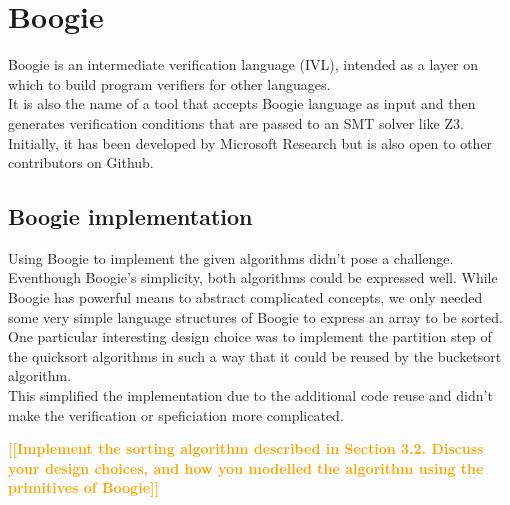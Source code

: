 \documentclass{report}
\newcommand{\todo}[1]{\textsf{\textbf{\textcolor{orange}{[[#1]]}}}}
\begin{document}
\section{Boogie}
\label{s:boogie}
Boogie is an intermediate verification language (IVL), intended as a layer on which to build program verifiers for other languages\cite{boogiegithub}.\\
It is also the name of a tool that accepts Boogie language as input and then generates verification conditions that are passed to an SMT solver like Z3\cite{z3}.\\
Initially, it has been developed by Microsoft Research but is also open to other contributors on Github.

\subsection{Boogie implementation}

Using Boogie to implement the given algorithms didn't pose a challenge.
Eventhough Boogie's simplicity, both algorithms could be expressed well.
While Boogie has powerful means to abstract complicated concepts, we only
needed some very simple language structures of Boogie to express an array to be
sorted.\\
One particular interesting design choice was to implement the partition step
of the quicksort algorithms in such a way that it could be reused by the bucketsort
algorithm.\\
This simplified the implementation due to the additional code reuse and didn't
make the verification or speficiation more complicated.

\todo{Implement the sorting algorithm described in
Section 3.2. Discuss your design choices, and how you modelled the algorithm using the
primitives of Boogie}
\end{document}
